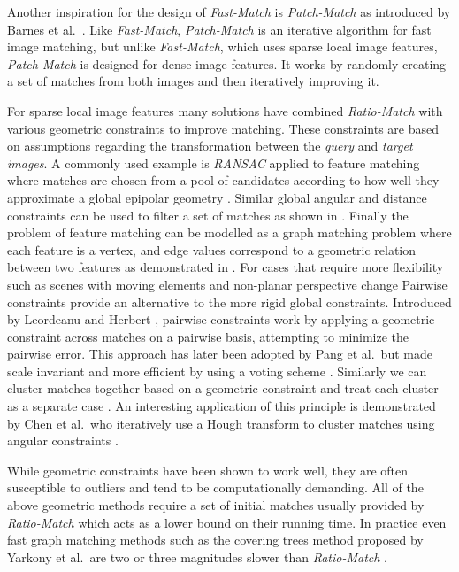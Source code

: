 \documentclass[runningheads]{llncs}
\begin{document}
Another inspiration for the design of \emph{Fast-Match} is \emph{Patch-Match} as introduced by Barnes et al.~\cite{barnes2009patchmatch}. Like \emph{Fast-Match}, \emph{Patch-Match} is an iterative algorithm for fast image matching, but unlike \emph{Fast-Match}, which uses sparse local image features, \emph{Patch-Match} is designed for dense image features. It works by randomly creating a set of matches from both images and then iteratively improving it.

For sparse local image features many solutions have combined \emph{Ratio-Match} with various geometric constraints to improve matching. These constraints are based on assumptions regarding the transformation between the \emph{query} and \emph{target images}. A commonly used example is \emph{RANSAC} applied to feature matching where matches are chosen from a pool of candidates according to how well they approximate a global epipolar geometry \cite{fischler1981ransac,torr2000mlesac,szeliski2010}. Similar global angular and distance constraints can be used to filter a set of matches as shown in \cite{kim2008efficient,schmid1997local}. Finally the problem of feature matching can be modelled as a graph matching problem where each feature is a vertex, and edge values correspond to a geometric relation between two features as demonstrated in \cite{torresani2008feature,yarkony2010covering,cho2010reweighted}. For cases that require more flexibility such as scenes with moving elements and non-planar perspective change Pairwise constraints provide an alternative to the more rigid global constraints. Introduced by Leordeanu and Herbert \cite{leordeanu2005spectral}, pairwise constraints work by applying a geometric constraint across matches on a pairwise basis, attempting to minimize the pairwise error. This approach has later been adopted by Pang et al.\ but made scale invariant and more efficient by using a voting scheme \cite{yuan2012efficient,pang2012scale}. Similarly we can cluster matches together based on a geometric constraint and treat each cluster as a separate case \cite{cho2009feature,wu2011robust}. An interesting application of this principle is demonstrated by Chen et al.\ who iteratively use a Hough transform to cluster matches using angular constraints \cite{chen2013robust}.

While geometric constraints have been shown to work well, they are often susceptible to outliers and tend to be computationally demanding. All of the above geometric methods require a set of initial matches usually provided by \emph{Ratio-Match} which acts as a lower bound on their running time. In practice even fast graph matching methods such as the covering trees method proposed by Yarkony et al.\ are two or three magnitudes slower than \emph{Ratio-Match} \cite{yarkony2010covering}.
\end{document}

